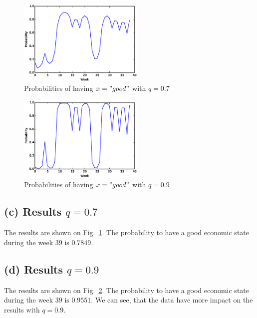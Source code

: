 \documentclass[a4paper]{article}
\begin{document}
\begin{figure}
    \begin{center}
        \includegraphics[width=6cm]{prob_07.eps}
        \caption{Probabilities of having $x = "good"$ with $q=0.7$}
        \label{fig:hmm07}
    \end{center}
\end{figure}

\begin{figure}
    \begin{center}
        \includegraphics[width=6cm]{prob_09.eps}
        \caption{Probabilities of having $x = "good"$ with $q=0.9$}
        \label{fig:hmm09}
    \end{center}
\end{figure}

\subsection{(c) Results $q=0.7$}
The results are shown on Fig.~\ref{fig:hmm07}. The probability to have a good economic state 
during the week $39$ is $0.7849$.

\subsection{(d) Results $q=0.9$}
The results are shown on Fig.~\ref{fig:hmm09}. The probability to have a good economic state
during the week $39$ is $0.9551$. We can see, that the data have more impact on the results
with $q=0.9$. 
\end{document}
